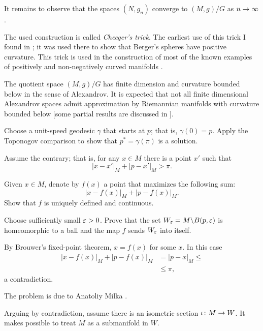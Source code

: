 It remains to observe that the spaces $(N,g_n)$ converge to $(M,g)/G$ as $n\z\to \infty$.\qeds

The used construction is called \emph{Cheeger's trick}.
The earliest use of this trick I found in \cite{GKM}; 
it was used there to show that Berger's spheres have positive curvature.
This trick is used in the construction of most of the known examples of positively and non-negatively curved manifolds
 \cite{cheeger,aloff-wallach,gromoll-meyer,eschenburg-spaces,bazajkin}.
 
The quotient space  $(M,g)/G$ has finite dimension and curvature bounded below in the sense of Alexandrov. 
It is expected that not all finite dimensional Alexandrov spaces admit approximation by Riemannian manifolds with curvature bounded below
[some partial results are discussed in ].








Choose a unit-speed geodesic $\gamma$ that starts at $p$;
that is, $\gamma(0)=p$.
Apply the Toponogov comparison to show that $p^*=\gamma(\pi)$ is a solution. 
\qeds

Assume the contrary;
that is, for any $x\in M$ there is a point $x'$ such that 
\[|x-x'|_M+|p-x'|_M>\pi.\]

Given $x\in M$, denote by $f(x)$ a point that maximizes the following sum:
\[|x-f(x)|_M+|p-f(x)|_M.\]
Show that $f$ is uniquely defined and continuous.

Choose sufficiently small $\varepsilon>0$.
Prove that the set $W_\varepsilon=M\backslash B(p,\varepsilon)$ 
is homeomorphic to a ball 
and the map $f$ sends $W_\varepsilon$ into itself.

By Brouwer's fixed-point theorem, $x=f(x)$ for some $x$.
In this case 
\begin{align*}
|x-f(x)|_M+|p-f(x)|_M&=|p-x|_M\le
\\
&\le\pi,
\end{align*}
a contradiction.\qeds
 
The problem is due to Anatoliy Milka \cite{milka-poly}.





Arguing by contradiction, 
assume there is an isometric section $\iota\: M\z\to W$.
It makes possible to treat $M$ as a submanifold in $W$.


